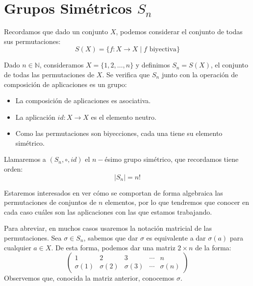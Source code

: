 \section{Grupos Simétricos $S_n$}\label{sec:grupos_simetricos}
Recordamos que dado un conjunto $X$, podemos considerar el conjunto de todas sus permutaciones:
\begin{equation*}
    S(X) = \{f:X\rightarrow X\mid f \text{\ biyectiva}\}
\end{equation*}

\begin{definicion}
    Dado $n\in \mathbb{N}$, consideramos $X=\{1,2,\ldots,n\}$ y definimos $S_n = S(X)$, el conjunto de todas las permutaciones de $X$. Se verifica que $S_n$ junto con la operación de composición de aplicaciones es un grupo:
    \begin{itemize}
        \item La composición de aplicaciones es asociativa.
        \item La aplicación $id:X\rightarrow X$ es el elemento neutro.
        \item Como las permutaciones son biyecciones, cada una tiene su elemento simétrico.
    \end{itemize}
    Llamaremos a $(S_n,\circ,id)$ el $n-$ésimo grupo simétrico, que recordamos tiene orden:
    \begin{equation*}
        |S_n| = n!
    \end{equation*}
\end{definicion}

\begin{notacion}
Estaremos interesados en ver cómo se comportan de forma algebraica las permutaciones de conjuntos de $n$ elementos, por lo que tendremos que conocer en cada caso cuáles son las aplicaciones con las que estamos trabajando.

Para abreviar, en muchos casos usaremos la notación matricial de las permutaciones. Sea $\sigma\in S_n$, sabemos que dar $\sigma$ es equivalente a dar $\sigma(a)$ para cualquier $a\in X$. De esta forma, podemos dar una matriz $2\times n$ de la forma:
\begin{equation*}
    \left(\begin{array}{ccccc}
        1 & 2 & 3 & \cdots & n \\
        \sigma(1) & \sigma(2) & \sigma(3) & \cdots & \sigma(n)
    \end{array}\right)
\end{equation*}
Observemos que, conocida la matriz anterior, conocemos $\sigma$.
\end{notacion}

